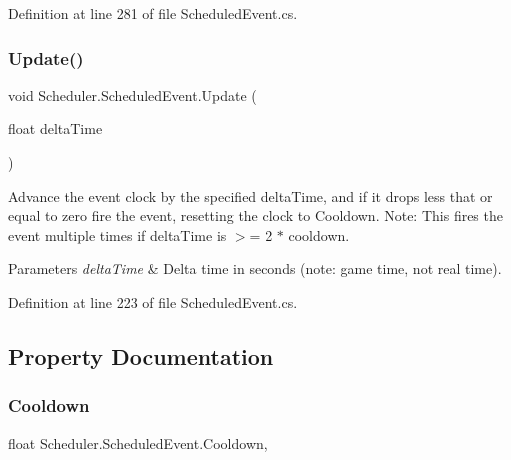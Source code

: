 Definition at line 281 of file Scheduled\+Event.\+cs.

\mbox{\label{class_scheduler_1_1_scheduled_event_a524553957da7bdb1e5bad3eeffd7ae8a}} 
\subsubsection{\texorpdfstring{Update()}{Update()}}
{\footnotesize\ttfamily void Scheduler.\+Scheduled\+Event.\+Update (\begin{DoxyParamCaption}\item[{float}]{delta\+Time }\end{DoxyParamCaption})}



Advance the event clock by the specified delta\+Time, and if it drops less that or equal to zero fire the event, resetting the clock to Cooldown. Note\+: This fires the event multiple times if delta\+Time is $>$= 2 $\ast$ cooldown. 


\begin{DoxyParams}{Parameters}
{\em delta\+Time} & Delta time in seconds (note\+: game time, not real time).\\
\hline
\end{DoxyParams}


Definition at line 223 of file Scheduled\+Event.\+cs.



\subsection{Property Documentation}
\mbox{\label{class_scheduler_1_1_scheduled_event_a63e25b478be5eb402b6c53cb6ad96adc}} 
\subsubsection{\texorpdfstring{Cooldown}{Cooldown}}
{\footnotesize\ttfamily float Scheduler.\+Scheduled\+Event.\+Cooldown\hspace{0.3cm}{\ttfamily [get]}, {}}



